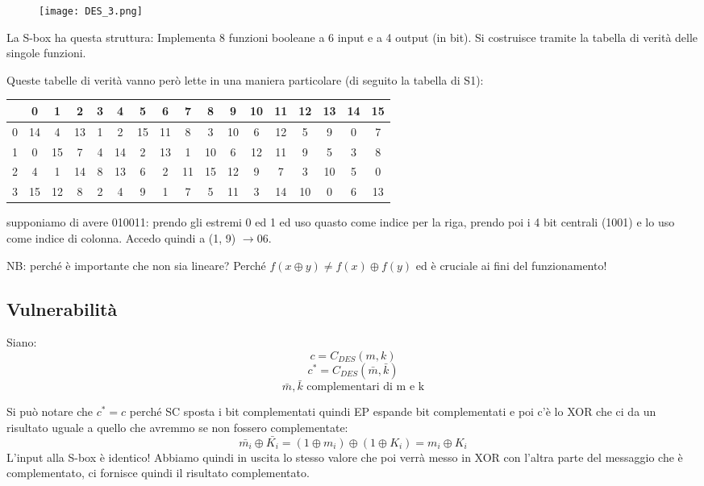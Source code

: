 \begin{wrapfigure}{l}{4cm}
    \texttt{[image: DES\_3.png]}
\end{wrapfigure}
La S-box ha questa struttura:
Implementa 8 funzioni booleane a 6 input e a 4 output (in bit).
Si costruisce tramite la tabella di verità delle singole funzioni.

\clearpage

Queste tabelle di verità vanno però lette in una maniera particolare (di seguito la tabella di S1):
\begin{table}[ht!]
    \centering
    \small
    \begin{tabular}{c|c c c c c c c c c c c c c c c c}
        & 0 & 1 & 2 & 3 & 4 & 5 & 6 & 7 & 8 & 9 & 10 & 11 & 12 & 13 & 14 & 15 \\
        \hline
        0 & 14 & 4 & 13 & 1 & 2 & 15 & 11 & 8 & 3 & 10 & 6 & 12 & 5 & 9 & 0 & 7 \\
        1 & 0 & 15 & 7 & 4 & 14 & 2 & 13 & 1 & 10 & 6 & 12 & 11 & 9 & 5 & 3 & 8 \\
        2 & 4 & 1 & 14 & 8 & 13 & 6 & 2 & 11 & 15 & 12 & 9 & 7 & 3 & 10 & 5 & 0 \\
        3 & 15 & 12 & 8 & 2 & 4 & 9 & 1 & 7 & 5 & 11 & 3 & 14 & 10 & 0 & 6 & 13 \\
    \end{tabular}
\end{table}
supponiamo di avere 010011: prendo gli estremi 0 ed 1 ed uso quasto come indice per la riga, prendo poi i 4 bit centrali (1001) e lo uso come indice di colonna. Accedo quindi a (1, 9) $\xrightarrow{} 06$.

NB: perché è importante che non sia lineare? Perché $f(x \oplus y) \neq f(x) \oplus f(y)$ ed è cruciale ai fini del funzionamento!

\subsection{Vulnerabilità}
Siano:
$$ c = C_{DES}(m, k) $$
$$ c^{*} = C_{DES}(\bar{m}, \bar{k}) $$
$$ \bar{m}, \bar{k} \text{ complementari di m e k} $$

Si può notare che $c^{*} = c$ perché SC sposta i bit complementati quindi EP espande bit complementati e poi c'è lo XOR che ci da un risultato uguale a quello che avremmo se non fossero complementate:
$$ \bar{m_i} \oplus \bar{K_i} = (1 \oplus m_i) \oplus (1 \oplus K_i) = m_i \oplus K_i $$
L'input alla S-box è identico! Abbiamo quindi in uscita lo stesso valore che poi verrà messo in XOR con l'altra parte del messaggio che è complementato, ci fornisce quindi il risultato complementato.

